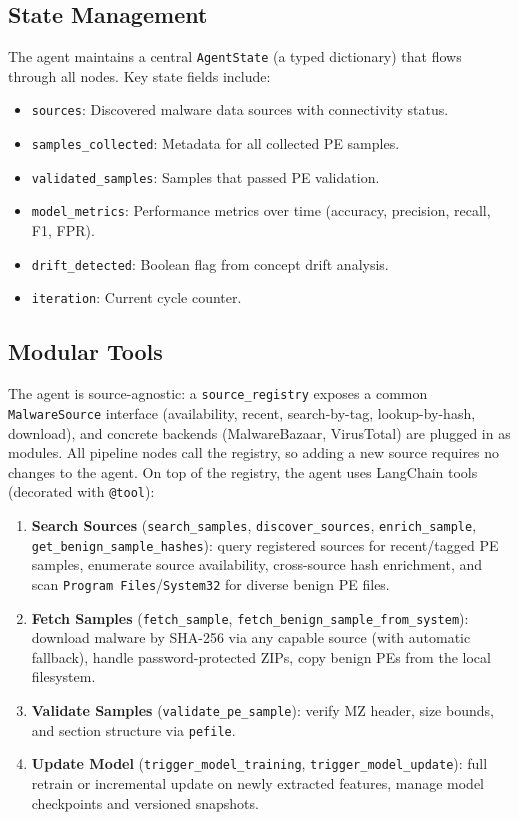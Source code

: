 \documentclass[12pt,a4paper]{article}
\begin{document}
\subsection{State Management}

The agent maintains a central \texttt{AgentState} (a typed dictionary) that flows through all nodes. Key state fields include:

\begin{itemize}
    \item \texttt{sources}: Discovered malware data sources with connectivity status.
    \item \texttt{samples\_collected}: Metadata for all collected PE samples.
    \item \texttt{validated\_samples}: Samples that passed PE validation.
    \item \texttt{model\_metrics}: Performance metrics over time (accuracy, precision, recall, F1, FPR).
    \item \texttt{drift\_detected}: Boolean flag from concept drift analysis.
    \item \texttt{iteration}: Current cycle counter.
\end{itemize}

\subsection{Modular Tools}

The agent is source-agnostic: a \texttt{source\_registry} exposes a common \texttt{MalwareSource} interface (availability, recent, search-by-tag, lookup-by-hash, download), and concrete backends (MalwareBazaar, VirusTotal) are plugged in as modules. All pipeline nodes call the registry, so adding a new source requires no changes to the agent. On top of the registry, the agent uses LangChain tools (decorated with \texttt{@tool}):

\begin{enumerate}
    \item \textbf{Search Sources} (\texttt{search\_samples}, \texttt{discover\_sources}, \texttt{enrich\_sample}, \texttt{get\_\allowbreak benign\_\allowbreak sample\_\allowbreak hashes}): query registered sources for recent/tagged PE samples, enumerate source availability, cross-source hash enrichment, and scan \texttt{Program Files}/\texttt{System32} for diverse benign PE files.
    \item \textbf{Fetch Samples} (\texttt{fetch\_sample}, \texttt{fetch\_\allowbreak benign\_\allowbreak sample\_\allowbreak from\_\allowbreak system}): download malware by SHA-256 via any capable source (with automatic fallback), handle password-protected ZIPs, copy benign PEs from the local filesystem.
    \item \textbf{Validate Samples} (\texttt{validate\_pe\_sample}): verify MZ header, size bounds, and section structure via \texttt{pefile}.
    \item \textbf{Update Model} (\texttt{trigger\_model\_training}, \texttt{trigger\_model\_update}): full retrain or incremental update on newly extracted features, manage model checkpoints and versioned snapshots.
\end{enumerate}
\end{document}
